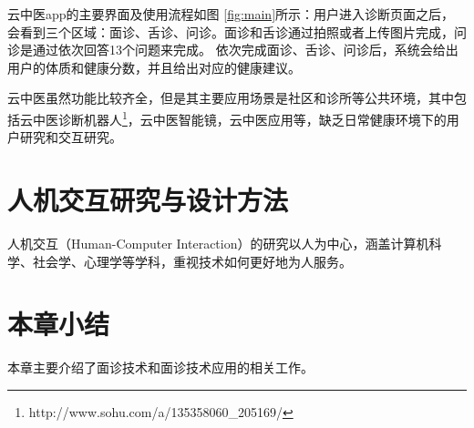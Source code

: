 云中医app的主要界面及使用流程如图 \ref{fig:main}所示：用户进入诊断页面之后，会看到三个区域：面诊、舌诊、问诊。面诊和舌诊通过拍照或者上传图片完成，问诊是通过依次回答13个问题来完成。
依次完成面诊、舌诊、问诊后，系统会给出用户的体质和健康分数，并且给出对应的健康建议。

云中医虽然功能比较齐全，但是其主要应用场景是社区和诊所等公共环境，其中包括云中医诊断机器人\footnote{http://www.sohu.com/a/135358060\_205169/}，云中医智能镜\cite{李雪2016}，云中医应用\cite{钱鹏基于云中医的健康监测方法及系统}等，缺乏日常健康环境下的用户研究和交互研究。


\section{人机交互研究与设计方法}
\cite{lazar2017research}
人机交互（Human-Computer Interaction）的研究以人为中心，涵盖计算机科学、社会学、心理学等学科，重视技术如何更好地为人服务。



\section{本章小结}
本章主要介绍了面诊技术和面诊技术应用的相关工作。

